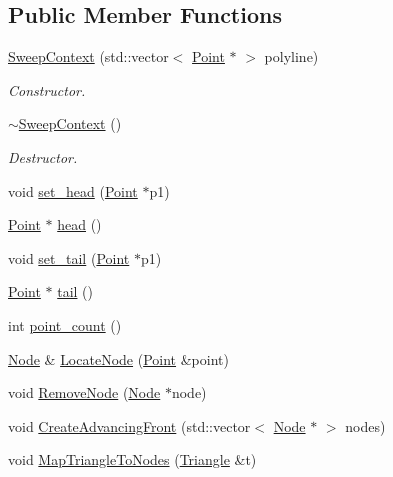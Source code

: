 \subsection*{Public Member Functions}
\begin{DoxyCompactItemize}
\item 
\hyperlink{classp2t_1_1_sweep_context_a2b500da0d77926f92fdcf41e45164ef4}{Sweep\+Context} (std\+::vector$<$ \hyperlink{structp2t_1_1_point}{Point} $\ast$ $>$ polyline)
\begin{DoxyCompactList}\small\item\em Constructor. \end{DoxyCompactList}\item 
\hyperlink{classp2t_1_1_sweep_context_a4275f1eb166fe4c69d18670898c65f98}{$\sim$\+Sweep\+Context} ()
\begin{DoxyCompactList}\small\item\em Destructor. \end{DoxyCompactList}\item 
void \hyperlink{classp2t_1_1_sweep_context_abd31ac7cc3ba9d418e08d5583ae7d32e}{set\+\_\+head} (\hyperlink{structp2t_1_1_point}{Point} $\ast$p1)
\item 
\hyperlink{structp2t_1_1_point}{Point} $\ast$ \hyperlink{classp2t_1_1_sweep_context_a18a228af449cec5e739b4303be83ddf1}{head} ()
\item 
void \hyperlink{classp2t_1_1_sweep_context_ac685ab377d5f1b184b4bb94e151a2af9}{set\+\_\+tail} (\hyperlink{structp2t_1_1_point}{Point} $\ast$p1)
\item 
\hyperlink{structp2t_1_1_point}{Point} $\ast$ \hyperlink{classp2t_1_1_sweep_context_a160d5f2ff0f93af7a577a36949a04623}{tail} ()
\item 
int \hyperlink{classp2t_1_1_sweep_context_a4ef94d299d632dee275dd511d7434c2d}{point\+\_\+count} ()
\item 
\hyperlink{structp2t_1_1_node}{Node} \& \hyperlink{classp2t_1_1_sweep_context_a501b441e104acc9504e5c3aa471b2f32}{Locate\+Node} (\hyperlink{structp2t_1_1_point}{Point} \&point)
\item 
void \hyperlink{classp2t_1_1_sweep_context_a0ea069bc88f6f7cd4b0022d988017d8d}{Remove\+Node} (\hyperlink{structp2t_1_1_node}{Node} $\ast$node)
\item 
void \hyperlink{classp2t_1_1_sweep_context_a09710e3b918586ccfed9f96553896a29}{Create\+Advancing\+Front} (std\+::vector$<$ \hyperlink{structp2t_1_1_node}{Node} $\ast$ $>$ nodes)
\item 
void \hyperlink{classp2t_1_1_sweep_context_aa1c59ec4b2bc6d6f3b248c452d6993c1}{Map\+Triangle\+To\+Nodes} (\hyperlink{classp2t_1_1_triangle}{Triangle} \&t)

\end{DoxyCompactItemize}
